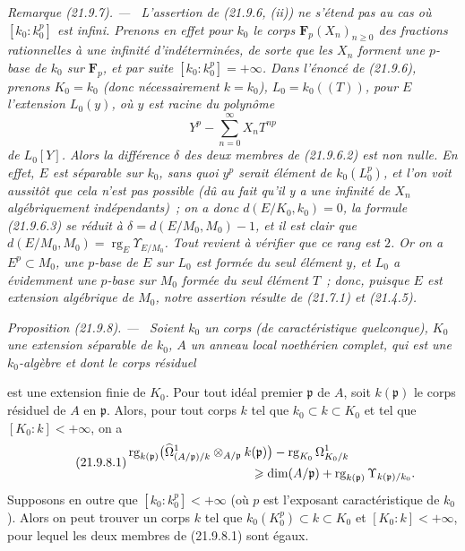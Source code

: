 \documentclass[10pt,oneside]{book}
\makeatletter
\newcommand{\setmanualcurrentlabel}[1]{\def\@currentlabel{#1}}
\newcommand{\oldpage}[2][]{%
  \setcounter{footnote}{0}%
  \marginpar{\scriptsize\textbf{#1}~|~#2}\ignorespaces}
\newenvironment{proposition}[1][]{%
  \setmanualcurrentlabel{#1}\par\medskip\noindent\itshape Proposition (#1). ---\ }{\par}
\newenvironment{remark}[1][]{%
  \setmanualcurrentlabel{#1}\par\medskip\noindent\itshape Remarque (#1). ---\ }{\par}
\makeatother
\begin{document}
\begin{remark}[21.9.7]
\label{0.21.9.7-fr}
L'assertion de (21.9.6, (ii)) \emph{ne s'étend pas} au cas où
$[k_0:k_0^p]$ est infini. Prenons en effet pour $k_0$ le corps
$\mathbf F_p(X_n)_{n\geqslant0}$ des fractions rationnelles à une infinité
d'indéterminées, de sorte que les $X_n$ forment une $p$-base de $k_0$ sur
$\mathbf F_p$, et par suite $[k_0:k_0^p]=+\infty$. Dans l'énoncé de (21.9.6),
prenons $K_0=k_0$ (donc nécessairement $k=k_0$), $L_0=k_0((T))$, pour $E$
l'extension $L_0(y)$, où $y$ est racine du polynôme
\[
  Y^p-\sum_{n=0}^{\infty}X_nT^{np}
\]
de $L_0[Y]$. Alors la différence $\delta$ des deux membres de (21.9.6.2) est
\emph{non nulle}. En effet, $E$ est \emph{séparable} sur $k_0$, sans quoi
$y^p$ serait élément de $k_0(L_0^p)$, et l'on voit aussitôt que cela n'est
pas possible (dû au fait qu'il y a une infinité de $X_n$ algébriquement
indépendants)~; on a donc $d(E/K_0,k_0)=0$, la formule (21.9.6.3) se réduit à
$\delta=d(E/M_0,M_0)-1$, et il est clair que
$d(E/M_0,M_0)=\operatorname{rg}_E\Upsilon_{E/M_0}$. Tout revient à vérifier
que ce rang est $2$. Or on a $E^p\subset M_0$, une $p$-base de $E$ sur $L_0$
est formée du seul élément $y$, et $L_0$ a évidemment une $p$-base sur $M_0$
formée du seul élément $T$~; donc, puisque $E$ est extension algébrique de
$M_0$, notre assertion résulte de (21.7.1) et (21.4.5).
\end{remark}

\begin{proposition}[21.9.8]
\label{0.21.9.8-fr}
Soient $k_0$ un corps (de caractéristique quelconque), $K_0$ une extension
séparable de $k_0$, $A$ un anneau local noethérien complet, qui est une
$k_0$-algèbre et dont le corps résiduel

\oldpage[0\textsubscript{IV-1}]{182}
est une extension finie de $K_0$. Pour tout idéal premier $\mathfrak p$ de
$A$, soit $k(\mathfrak p)$ le corps résiduel de $A$ en $\mathfrak p$. Alors,
pour tout corps $k$ tel que $k_0\subset k\subset K_0$ et tel que
$[K_0:k]<+\infty$, on a
\begin{equation}
\tag{21.9.8.1}
\label{0.21.9.8.1-fr}
\begin{split}
  &\operatorname{rg}_{k(\mathfrak p)}
    \bigl(\widehat\Omega^1_{(A/\mathfrak p)/k}
      \otimes_{A/\mathfrak p}k(\mathfrak p)\bigr)
    -\operatorname{rg}_{K_0}\Omega^1_{K_0/k}\\
  &\hspace{35mm}\geqslant
    \dim(A/\mathfrak p)
    +\operatorname{rg}_{k(\mathfrak p)}\Upsilon_{k(\mathfrak p)/k_0}.
\end{split}
\end{equation}
Supposons en outre que $[k_0:k_0^p]<+\infty$ (où $p$ est l'exposant
caractéristique de $k_0$). Alors on peut trouver un corps $k$ tel que
$k_0(K_0^p)\subset k\subset K_0$ et $[K_0:k]<+\infty$, pour lequel les deux
membres de (21.9.8.1) sont égaux.
\end{proposition}
\end{document}
